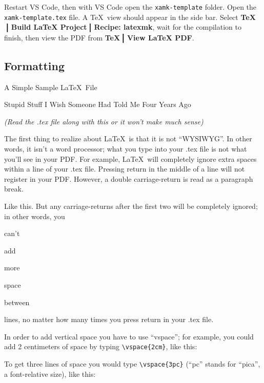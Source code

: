 Restart VS Code, then with VS Code open the \texttt{xamk-template} folder.
Open the \texttt{xamk-template.tex} file.
A \TeX\ view should appear in the side bar.
Select \textbf{\TeX$\big\bracevert$Build LaTeX Project$\big\bracevert$Recipe: latexmk}, wait for the compilation to finish, then view the PDF from \textbf{\TeX$\big\bracevert$View LaTeX PDF}.

\subsection{Formatting}

{\centering\sc \large A Simple Sample \LaTeX\ File \parencite{formatting}\par}
\centerline{\sc Stupid Stuff I Wish Someone Had Told Me Four Years Ago}
\centerline{\it (Read the .tex file along with this or it won't make much sense)}

The first thing to realize about \LaTeX\ is that it is not ``WYSIWYG''.
In other words, it isn't a word processor; what you type into your .tex file is not what you'll see in your PDF.
For example, \LaTeX\ will      completely     ignore               extra    spaces    within                             a line of your .tex file.
Pressing return
in
the
middle
of
a
line
will not register in your PDF.
However, a double carriage-return is read as a paragraph break.

Like this.
But any carriage-returns after the first two will be completely ignored; in other words, you


can't

add






more




space


between




lines, no matter how many times you press return in your .tex file.

In order to add vertical space you have to use ``vspace''; for example, you could add 2 centimeters of space by typing \verb|\vspace{2cm}|, like this:
\vspace{2cm}

To get three lines of space you would type \verb|\vspace{3pc}| (``pc'' stands for ``pica'', a font-relative size), like this:
\vspace{3pc}

